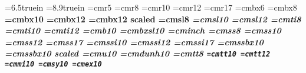 %
%	
%		
%

\parindent=10mm      %
\hsize=6.5truein    %
\vsize=8.9truein     %
\lineskiplimit=2pt   %
\lineskip=3pt        %
%
\font\rmlil=cmr5
\font\rmsm=cmr8
\font\rm=cmr10
\font\rmtwelve=cmr12
\font\rmseventeen=cmr17
%
%
\font\bflil=cmbx6
\font\bfsm=cmbx8
\font\bf=cmbx10 
\font\bftwelve=cmbx12 
\font\bflarge=cmbx12 scaled
%
%
\font\slsm=cmsl8
\font\sl=cmsl10
\font\sltwelve=cmsl12
%
%
\font\itsm=cmti8
\font\it=cmti10
\font\itwelve=cmti12
%
%
\font\nb=cmb10
%
%
\font\slab=cmbxsl10 
%
%
\font\big=cminch
%
%
\font\sansm=cmss8
\font\san=cmss10 
\font\santwelve=cmss12
\font\sanseventeen=cmss17
%
%
\font\sani=cmssi10
\font\sanitwelve=cmssi12
\font\saniseventeen=cmssi17
%
%
\font\sanb=cmssbx10
\font\sanbtwelve=cmssbx10 scaled
%
%
\font\usit=cmu10
%
%
\font\dun=cmdunh10
%
%
\font\ttsmall=cmtt8
\font\tt=cmtt10
\font\tttwelve=cmtt12
%
%
\font\mathitalics=cmmi10
\font\mathsymbol=cmsy10
\font\mathextended=cmex10

\rm                                             %
%
%
\def\double{\baselineskip=24pt \parskip=0pt}   %
\def\single{\baselineskip=12pt \parskip=6pt}    %
\single                                         %
\def\cpp{C\kern -.07em\raise .25ex\hbox{+}\kern -.1em\raise .25ex\hbox{+}}
\def\bcc{{\it Borland \cpp\ 2.0}}		%
\def\tasm{{\it Turbo Assembler 2.5}}		%
\def\fpfmt#1#2{$#1\times 10^{#2}$}		%
%
%
\newcount\itemcount
\def\nitem#1{\itemcount=#1
\par\loop\advance\itemcount by-1 \ifnum\itemcount>0 \indent\repeat
\hangindent#1\parindent \textindent}

